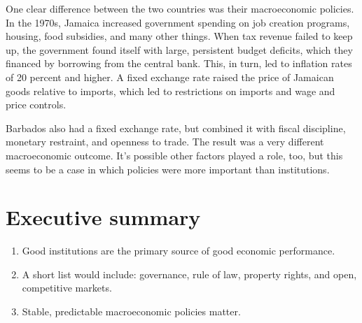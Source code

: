 One clear difference between the two countries was their
macroeconomic policies.
In the 1970s, Jamaica increased government spending
on job creation programs, housing, food subsidies, and many other things.
When tax revenue failed to keep up, the government found itself
with large, persistent budget deficits, which they financed by
borrowing from the central bank.
This, in turn, led to inflation rates of 20 percent and higher.
A fixed exchange rate raised the price of Jamaican goods relative to imports,
which led to restrictions on imports and wage and price controls.

Barbados also had a fixed exchange rate,
but combined it with fiscal discipline, monetary restraint,
and openness to trade.
The result was a very different macroeconomic outcome.
It's possible other factors played a role, too,
but this seems to be a case in which policies were more
important than institutions.

\begin{comment}
\section{Other factors}

[??]

Democracy, resources, education,....

Summarize evidence.  Mention Barro, Easterly...

Cause or effect?
\end{comment}

\section*{Executive summary}

\setlength{\leftmargini}{.5\oldleftmargini}
\begin{enumerate}
\item Good institutions are the primary source of good economic performance.
\item A short list would include:  governance, rule of law,
property rights, and open, competitive markets.
\item Stable, predictable macroeconomic policies matter.
\end{enumerate}
\setlength{\leftmargini}{\oldleftmargini}

\begin{comment}
\section*{Review questions}

\begin{enumerate}
\item ...
\end{enumerate}
\end{comment}

